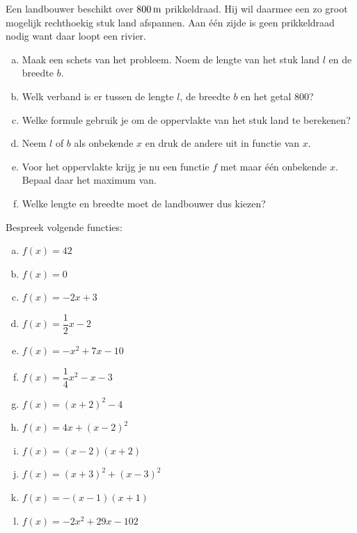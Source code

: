 \documentclass[12pt]{article}
\begin{document}
\begin{oefening}
Een landbouwer beschikt over $800 \m$ prikkeldraad. Hij wil daarmee een zo groot mogelijk rechthoekig stuk land afspannen. Aan één zijde is geen prikkeldraad nodig want daar loopt een rivier.
\begin{enumerate}[(a)]
  \item Maak een schets van het probleem. Noem de lengte van het stuk land $l$ en de breedte $b$.
  \item Welk verband is er tussen de lengte $l$, de breedte $b$ en het getal $800$?
  \item Welke formule gebruik je om de oppervlakte van het stuk land te berekenen?
  \item Neem $l$ of $b$ als onbekende $x$ en druk de andere uit in functie van $x$.
  \item Voor het oppervlakte krijg je nu een functie $f$ met maar één onbekende $x$. Bepaal daar het maximum van.
  \item Welke lengte en breedte moet de landbouwer dus kiezen?
\end{enumerate}
\end{oefening}

\begin{oefening}
Bespreek volgende functies:
\begin{multicols}{2}
\begin{enumerate}[(a)]
  \itemsep.5em
  \item $\displaystyle f(x)=42$
  \item $\displaystyle f(x)=0$
  \item $\displaystyle f(x)=-2x+3$
  \item $\displaystyle f(x)=\dfrac{1}{2}x-2$
  \item $\displaystyle f(x)=-x^2+7x-10$
  \item $\displaystyle f(x)=\dfrac{1}{4}x^2-x-3$
  \item $f(x)=(x+2)^2-4$
  \item $f(x)=4x+(x-2)^2$
  \item $f(x)=(x-2)(x+2)$
  \item $f(x)=(x+3)^2+(x-3)^2$
  \item $f(x)=-(x-1)(x+1)$
  \item $f(x)=-2x^2+29x-102$
\end{enumerate}
\end{multicols}
\end{oefening}
\end{document}
